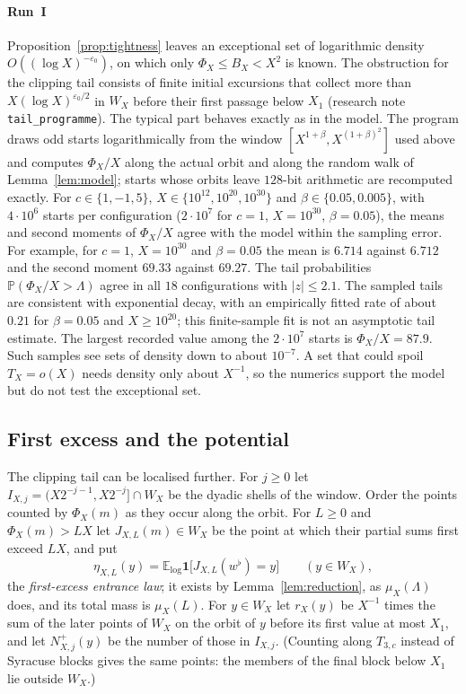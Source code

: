 \documentclass[12pt]{amsart}
\theoremstyle{definition}
\theoremstyle{remark}
\begin{document}
\paragraph{Run~I} Proposition~\ref{prop:tightness} leaves an exceptional set of logarithmic density $O((\log X)^{-\varepsilon_0})$, on which only $\Phi_X\le B_X<X^2$ is known. The obstruction for the clipping tail consists of finite initial excursions that collect more than $X(\log X)^{\varepsilon_0/2}$ in $W_X$ before their first passage below $X_1$ (research note \texttt{tail\_programme}). The typical part behaves exactly as in the model. The program  draws odd starts logarithmically from the
window $[X^{1+\beta},X^{(1+\beta)^2}]$ used above and computes
$\Phi_X/X$ along the actual orbit and along the random walk of
Lemma~\ref{lem:model}; starts whose orbits leave $128$-bit arithmetic
are recomputed exactly. For $c\in\{1,-1,5\}$,
$X\in\{10^{12},10^{20},10^{30}\}$ and $\beta\in\{0.05,0.005\}$, with
$4\cdot10^6$ starts per configuration ($2\cdot10^7$ for $c=1$,
$X=10^{30}$, $\beta=0.05$), the means and second moments of $\Phi_X/X$
agree with the model within the sampling error. For example, for $c=1$,
$X=10^{30}$ and $\beta=0.05$ the mean is $6.714$ against $6.712$ and the
second moment $69.33$ against $69.27$. The tail probabilities
$\mathbb P(\Phi_X/X>\Lambda)$ agree in all $18$ configurations with
$|z|\le2.1$. The sampled tails are consistent with exponential decay, with an
empirically fitted rate of about $0.21$ for $\beta=0.05$ and
$X\ge10^{20}$; this finite-sample fit is not an asymptotic tail
estimate. The largest recorded value among the $2\cdot10^7$ starts
is $\Phi_X/X=87.9$. Such samples see sets of
density down to about $10^{-7}$. A set that could spoil $T_X=o(X)$ needs
density only about $X^{-1}$, so the numerics support the model but do
not test the exceptional set.

\subsection{First excess and the potential}
\label{subsec:first-excess}
The clipping tail can be localised further. For $j\ge0$ let $I_{X,j}=(X2^{-j-1},X2^{-j}]\cap W_X$ be the dyadic shells of the window. Order the points counted by $\Phi_X(m)$ as they occur along the orbit. For $L\ge0$ and $\Phi_X(m)>LX$ let $J_{X,L}(m)\in W_X$ be the point at which their partial sums first exceed $LX$, and put
\[
 \eta_{X,L}(y)=\mathbb E_{\log}\mathbf 1\bigl[J_{X,L}(w^\flat)=y\bigr]\qquad(y\in W_X),
\]
the \emph{first-excess entrance law}; it exists by Lemma~\ref{lem:reduction}, as $\mu_X(\Lambda)$ does, and its total mass is $\mu_X(L)$. For $y\in W_X$ let $r_X(y)$ be $X^{-1}$ times the sum of the later points of $W_X$ on the orbit of $y$ before its first value at most $X_1$, and let $N^+_{X,j}(y)$ be the number of those in $I_{X,j}$. (Counting along $T_{3,c}$ instead of Syracuse blocks gives the same points: the members of the final block below $X_1$ lie outside $W_X$.)
\end{document}
